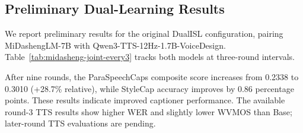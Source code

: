 % 
\subsection{Preliminary Dual-Learning Results}

We report preliminary results for the original DualISL configuration, pairing
MiDashengLM-7B with Qwen3-TTS-12Hz-1.7B-VoiceDesign.
Table~\ref{tab:midasheng-joint-every3} tracks both models at three-round intervals.



After nine rounds, the ParaSpeechCaps composite score increases from 0.2338
to 0.3010 (+28.7\% relative), while StyleCap accuracy improves by 0.86
percentage points. These results indicate improved captioner performance.
The available round-3 TTS results show higher WER and slightly lower WVMOS
than Base; later-round TTS evaluations are pending.
